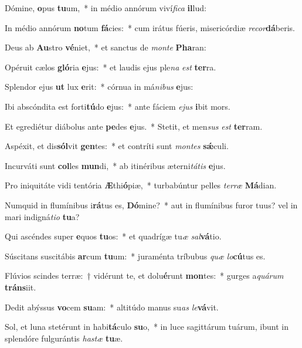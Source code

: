 \item Dómine, \textbf{o}pus \textbf{tu}um,~* in médio annórum viví\textit{fica} \textbf{il}lud:
\item In médio annórum \textbf{no}tum \textbf{fá}cies:~* cum irátus fúeris, misericórdiæ \textit{recor}\textbf{dá}beris.
\item Deus ab \textbf{Au}stro \textbf{vé}niet,~* et san\-ctus de \textit{monte} \textbf{Pha}ran:
\item Opéruit cælos \textbf{gló}ria \textbf{e}jus:~* et laudis ejus ple\textit{na} \textit{est} \textbf{ter}ra.
\item Splendor ejus \textbf{ut} lux \textbf{e}rit:~* córnua in má\hspace{0.02em}\textit{nibus} \textbf{e}jus:
\item Ibi abscóndita est forti\textbf{tú}do \textbf{e}jus:~* ante fáciem \textit{ejus} \textbf{i}bit mors.
\item Et egrediétur diábolus ante \textbf{pe}des \textbf{e}jus.~* Stetit, et men\hspace{0.03em}\textit{sus} \textit{est} \textbf{ter}ram.
\item Aspéxit, et dis\textbf{sól}vit \textbf{gen}tes:~* et contríti sunt \textit{montes} \textbf{sǽ}culi.
\item Incurváti sunt \textbf{col}les \textbf{mun}di,~* ab itinéribus æterni\textit{tátis} \textbf{e}jus.
\item Pro iniquitáte vidi tentória \textbf{Æ}thi\textbf{ó}piæ,~* turbabúntur pelles \textit{terræ} \textbf{Má}dian.
\item Numquid in flumínibus i\textbf{rá}tus es, \textbf{Dó}mine?~* aut in flumínibus furor tuus? vel in mari indigná\textit{tio} \textbf{tu}a?
\item Qui ascéndes super \textbf{e}quos \textbf{tu}os:~* et quadrígæ tu\textit{æ} \textit{sal}\textbf{vá}tio.
\item Súscitans suscitábis \textbf{ar}cum \textbf{tu}um:~* juraménta tríbubus \textit{quæ} \textit{lo}\textbf{cú}tus es.
\item Flúvios scindes terræ:~† vidérunt te, et dolu\textbf{é}runt \textbf{mon}tes:~* gurges a\hspace{0.03em}\textit{quárum} \textbf{tráns}iit.
\item Dedit abýssus \textbf{vo}cem \textbf{su}am:~* altitúdo manus su\hspace{0.03em}\textit{as} \textit{le}\textbf{vá}vit.
\item Sol, et luna stetérunt in habi\textbf{tá}culo \textbf{su}o,~* in luce sagittárum tuárum, ibunt in splendóre fulgurántis \textit{hastæ} \textbf{tu}æ.
